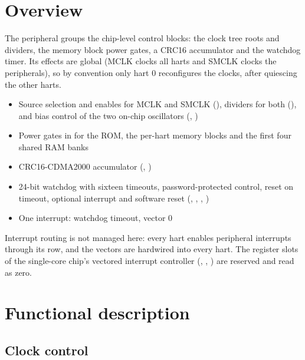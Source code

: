 \section{Overview}

The  peripheral groups the chip-level control blocks: the clock tree roots and dividers, the memory block power gates, a CRC16 accumulator and the watchdog timer. Its effects are global (MCLK clocks all harts and SMCLK clocks the peripherals), so by convention only hart 0 reconfigures the clocks, after quiescing the other harts.

\begin{itemize}
	\item Source selection and enables for MCLK and SMCLK (), dividers for both (), and bias control of the two on-chip oscillators (, )
	\item Power gates in  for the ROM, the per-hart memory blocks and the first four shared RAM banks
	\item CRC16-CDMA2000 accumulator (, )
	\item 24-bit watchdog with sixteen timeouts, password-protected control, reset on timeout, optional interrupt and software reset (, , , )
	\item One interrupt: watchdog timeout, vector 0
\end{itemize}

Interrupt routing is not managed here: every hart enables peripheral interrupts through its  row, and the  vectors are hardwired into every hart. The register slots of the single-core chip's vectored interrupt controller (, , ) are reserved and read as zero.

\section{Functional description}

\subsection{Clock control} \label{ss:clocks}

